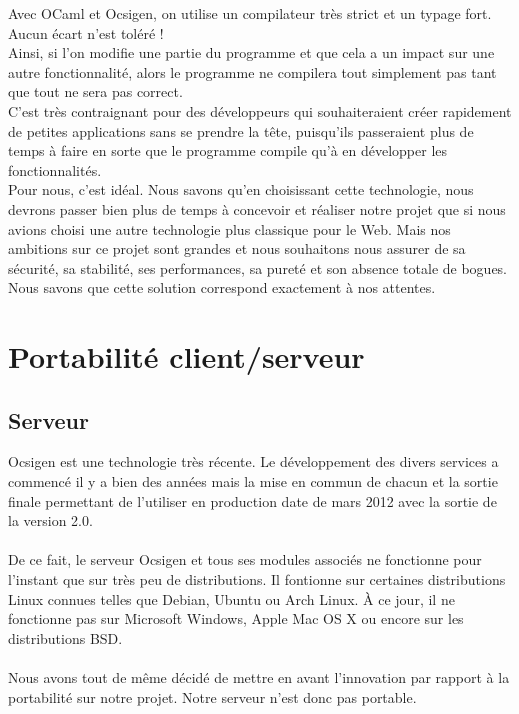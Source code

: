 \documentclass{life-fr}
\begin{document}
\newpage

Avec OCaml et Ocsigen, on utilise un compilateur très strict et un typage fort. Aucun écart n'est toléré !\\
Ainsi, si l'on modifie une partie du programme et que cela a un impact sur une autre fonctionnalité, alors le programme ne compilera tout simplement pas tant que tout ne sera pas correct.\\

C'est très contraignant pour des développeurs qui souhaiteraient créer rapidement de petites applications sans se prendre la tête, puisqu'ils passeraient plus de temps à faire en sorte que le programme compile qu'à en développer les fonctionnalités.\\
Pour nous, c'est idéal. Nous savons qu'en choisissant cette technologie, nous devrons passer bien plus de temps à concevoir et réaliser notre projet que si nous avions choisi une autre technologie plus classique pour le Web. Mais nos ambitions sur ce projet sont grandes et nous souhaitons nous assurer de sa sécurité, sa stabilité, ses performances, sa pureté et son absence totale de bogues. Nous savons que cette solution correspond exactement à nos attentes.
\\

\section{Portabilité client/serveur}

\subsection{Serveur}

Ocsigen est une technologie très récente. Le développement des divers services a
commencé il y a bien des années mais la mise en commun de chacun et la sortie
finale permettant de l'utiliser en production date de mars 2012 avec la sortie
de la version 2.0.\\
\\
De ce fait, le serveur Ocsigen et tous ses modules associés ne fonctionne
pour l'instant que sur très peu de distributions. Il fontionne sur certaines
distributions Linux connues telles que Debian, Ubuntu ou Arch Linux. À ce jour, 
il ne fonctionne pas sur Microsoft Windows, Apple Mac OS X ou encore sur les 
distributions BSD.\\
\\
Nous avons tout de même décidé de mettre en avant l'innovation par rapport
à la portabilité sur notre projet. Notre serveur n'est donc pas portable.
\end{document}
